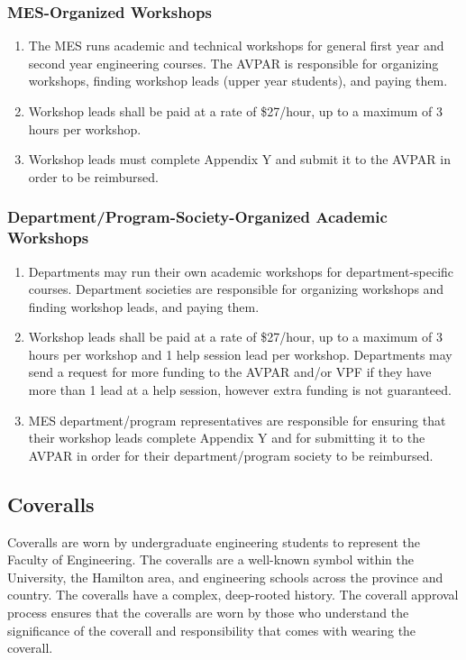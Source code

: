 \subsubsection{MES-Organized
  Workshops}
\label{mes-organized-workshops}
\begin{enumerate}
 \item
  The MES runs academic and technical workshops for general first year
  and second year engineering courses. The AVPAR is responsible for
  organizing workshops, finding workshop leads (upper year students),
  and paying them.
 \item
  Workshop leads shall be paid at a rate of \$27/hour, up to a maximum
  of 3 hours per workshop.
 \item
  Workshop leads must complete Appendix Y and submit it to the AVPAR in
  order to be reimbursed.

\end{enumerate}

\subsubsection{Department/Program-Society-Organized Academic
  Workshops}
\label{departmentprogram-society-organized-academic-workshops}
\begin{enumerate}
 \item
  Departments may run their own academic workshops for
  department-specific courses. Department societies are responsible for
  organizing workshops and finding workshop leads, and paying them.
 \item
  Workshop leads shall be paid at a rate of \$27/hour, up to a maximum
  of 3 hours per workshop and 1 help session lead per workshop.
  Departments may send a request for more funding to the AVPAR and/or
  VPF if they have more than 1 lead at a help session, however extra
  funding is not guaranteed.
 \item
  MES department/program representatives are responsible for ensuring
  that their workshop leads complete Appendix Y and for submitting it to
  the AVPAR in order for their department/program society to be
  reimbursed.
\end{enumerate}

\subsection{Coveralls}
\label{coveralls}
Coveralls are worn by undergraduate engineering students to represent
the Faculty of Engineering. The coveralls are a well-known symbol within
the University, the Hamilton area, and engineering schools across the
province and country. The coveralls have a complex, deep-rooted history.
The coverall approval process ensures that the coveralls are worn by
those who understand the significance of the coverall and responsibility
that comes with wearing the coverall.


